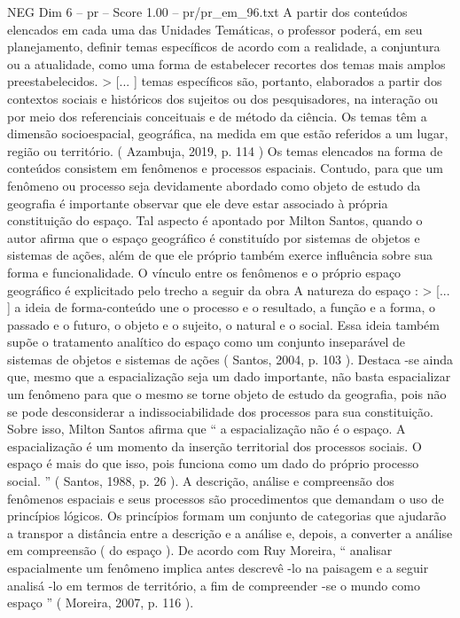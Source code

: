 \begin{textsample}{NEG Dim 6 – pr – Score 1.00 – pr/pr\_em\_96.txt}
A partir dos conteúdos elencados em cada uma das Unidades Temáticas, o professor poderá, em seu planejamento, definir temas específicos de acordo com a realidade, a conjuntura ou a atualidade, como uma forma de estabelecer recortes dos temas mais amplos preestabelecidos. > [... ] temas específicos são, portanto, elaborados a partir dos contextos sociais e históricos dos sujeitos ou dos pesquisadores, na interação ou por meio dos referenciais conceituais e de método da ciência.
Os temas têm a dimensão socioespacial, geográfica, na medida em que estão referidos a um lugar, região ou território. ( Azambuja, 2019, p. 114 ) Os temas elencados na forma de conteúdos consistem em fenômenos e processos espaciais.
Contudo, para que um fenômeno ou processo seja devidamente abordado como objeto de estudo da geografia é importante observar que ele deve estar associado à própria constituição do espaço.
Tal aspecto é apontado por Milton Santos, quando o autor afirma que o espaço geográfico é constituído por sistemas de objetos e sistemas de ações, além de que ele próprio também exerce influência sobre sua forma e funcionalidade.
O vínculo entre os fenômenos e o próprio espaço geográfico é explicitado pelo trecho a seguir da obra A natureza do espaço : > [... ] a ideia de forma-conteúdo une o processo e o resultado, a função e a forma, o passado e o futuro, o objeto e o sujeito, o natural e o social.
Essa ideia também supõe o tratamento analítico do espaço como um conjunto inseparável de sistemas de objetos e sistemas de ações ( Santos, 2004, p. 103 ).
Destaca -se ainda que, mesmo que a espacialização seja um dado importante, não basta espacializar um fenômeno para que o mesmo se torne objeto de estudo da geografia, pois não se pode desconsiderar a indissociabilidade dos processos para sua constituição.
Sobre isso, Milton Santos afirma que “ a espacialização não é o espaço.
A espacialização é um momento da inserção territorial dos processos sociais.
O espaço é mais do que isso, pois funciona como um dado do próprio processo social. ” ( Santos, 1988, p. 26 ).
A descrição, análise e compreensão dos fenômenos espaciais e seus processos são procedimentos que demandam o uso de princípios lógicos.
Os princípios formam um conjunto de categorias que ajudarão a transpor a distância entre a descrição e a análise e, depois, a converter a análise em compreensão ( do espaço ).
De acordo com Ruy Moreira, “ analisar espacialmente um fenômeno implica antes descrevê -lo na paisagem e a seguir analisá -lo em termos de território, a fim de compreender -se o mundo como espaço ” ( Moreira, 2007, p. 116 ).

\end{textsample}
